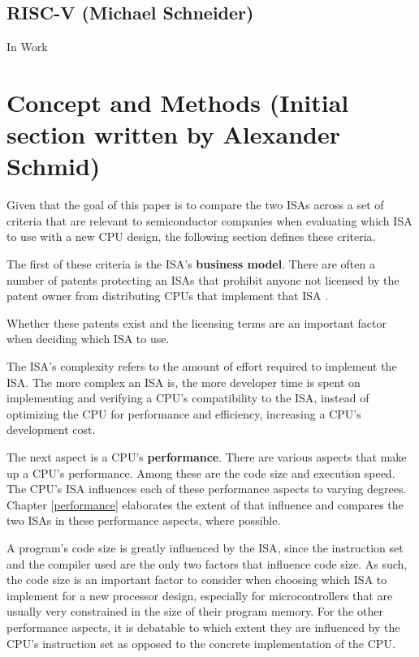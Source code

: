 \documentclass[conference]{IEEEtran}
\begin{document}
	\subsection{RISC-V (Michael Schneider)}
	In Work	

\section{Concept and Methods (Initial section written by Alexander Schmid)}
\label{ref:concept}

Given that the goal of this paper is to compare the two \glspl{ISA}
across a set of criteria that are relevant to semiconductor companies when evaluating which \gls{ISA} to use with a new CPU design,
the following section defines these criteria.

The first of these criteria is the \gls{ISA}'s \textbf{business model}. There are often a number of patents protecting an \glspl{ISA} that prohibit anyone not licensed
by the patent owner from distributing \glspl{CPU} that implement that \gls{ISA} \cite{Tang2011}.

Whether these patents exist and the licensing terms
are an important factor when deciding which \gls{ISA} to use.

The \gls{ISA}'s complexity refers to the amount of effort required to implement the \gls{ISA}. The more complex an \gls{ISA} is, the more developer
time is spent on implementing and verifying a \gls{CPU}'s compatibility to the \gls{ISA}, instead of optimizing the \gls{CPU} for performance and efficiency,
increasing a \gls{CPU}'s development cost. \cite{Patterson1980}

The next aspect is a \gls{CPU}'s \textbf{performance}. There are various aspects that make up a \gls{CPU}'s performance.
Among these are the code size and execution speed.
The \gls{CPU}'s \gls{ISA} influences each of these performance aspects to varying degrees. Chapter \ref{performance} elaborates
the extent of that influence and compares the two \glspl{ISA} in these performance aspects, where possible.

A program's code size is greatly influenced by the \gls{ISA}, since the instruction set and the compiler used are the only two factors that influence
code size. As such, the code size is an important factor to consider when choosing which \gls{ISA} to implement for a new processor design, especially
for microcontrollers that are usually very constrained in the size of their program memory.
For the other performance aspects, it is debatable to which extent they are influenced by the \gls{CPU}'s instruction set as opposed
to the concrete implementation of the CPU. \cite{Blem2013} \cite{Akram2017}
\end{document}
